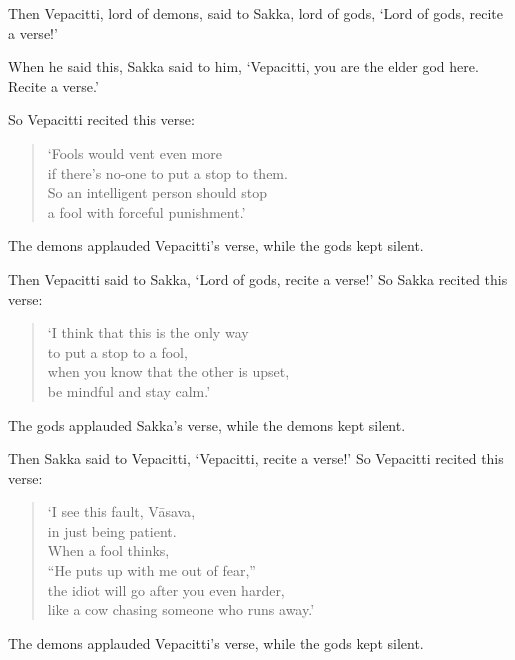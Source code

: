 \documentclass[12pt,openany]{book}%
\begin{document}
Then Vepacitti, lord of demons, said to Sakka, lord of gods, ‘Lord of gods, recite a verse!’ 

When he said this, Sakka said to him, ‘Vepacitti, you are the elder god here. Recite a verse.’ 

So Vepacitti recited this verse: 

\begin{verse}%
‘Fools would vent even more \\
if there’s no-one to put a stop to them. \\
So an intelligent person should stop \\
a fool with forceful punishment.’ 

%
\end{verse}

The demons applauded Vepacitti’s verse, while the gods kept silent. 

Then Vepacitti said to Sakka, ‘Lord of gods, recite a verse!’ So Sakka recited this verse: 

\begin{verse}%
‘I think that this is the only way \\
to put a stop to a fool, \\
when you know that the other is upset, \\
be mindful and stay calm.’ 

%
\end{verse}

The gods applauded Sakka’s verse, while the demons kept silent. 

Then Sakka said to Vepacitti, ‘Vepacitti, recite a verse!’ So Vepacitti recited this verse: 

\begin{verse}%
‘I see this fault, \textsanskrit{Vāsava}, \\
in just being patient. \\
When a fool thinks, \\
“He puts up with me out of fear,” \\
the idiot will go after you even harder, \\
like a cow chasing someone who runs away.’ 

%
\end{verse}

The demons applauded Vepacitti’s verse, while the gods kept silent. 
\end{document}
